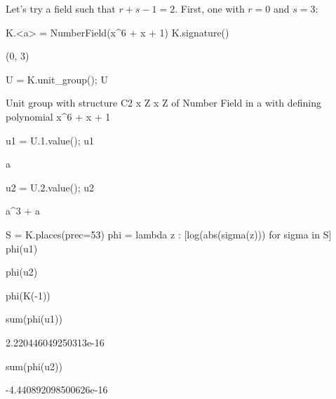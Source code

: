 Let's try a field such that $r+s-1=2$.  First, one with $r=0$ and
$s=3$:
\begin{sagecode}
\begin{sagecell}
K.<a> = NumberField(x^6 + x + 1)
K.signature()
\end{sagecell}
\begin{sageout}
(0, 3)
\end{sageout}
\begin{sagecell}
U = K.unit_group(); U
\end{sagecell}
\begin{sageout}
Unit group with structure C2 x Z x Z of Number Field in a with
defining polynomial x^6 + x + 1
\end{sageout}
\begin{sagecell}
u1 = U.1.value(); u1
\end{sagecell}
\begin{sageout}
a
\end{sageout}
\begin{sagecell}
u2 = U.2.value(); u2
\end{sagecell}
\begin{sageout}
a^3 + a
\end{sageout}
\begin{sagecell}
S = K.places(prec=53)
phi = lambda z : [log(abs(sigma(z))) for sigma in S]
phi(u1)
\end{sagecell}
\begin{sageout}
[-0.16741548328589614, 0.04864390975267338, 0.11877157353322298]
\end{sageout}
\begin{sagecell}
phi(u2)
\end{sagecell}
\begin{sageout}
[0.30678570892329504, -1.0725146505489758, 0.7657289416256803]
\end{sageout}
\begin{sagecell}
phi(K(-1))
\end{sagecell}
\begin{sageout}
[0.0, 0.0, 0.0]
\end{sageout}
\begin{sagecell}
sum(phi(u1))
\end{sagecell}
\begin{sageout}
2.220446049250313e-16
\end{sageout}
\begin{sagecell}
sum(phi(u2))
\end{sagecell}
\begin{sageout}
-4.440892098500626e-16
\end{sageout}
\end{sagecode}


